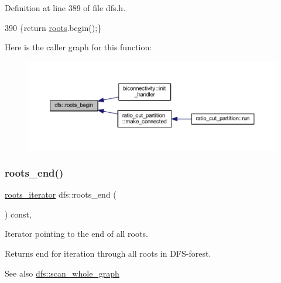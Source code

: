 Definition at line 389 of file dfs.\+h.


\begin{DoxyCode}
390     \{\textcolor{keywordflow}{return} \mbox{\hyperlink{classdfs_a0bbd5cb8df26c891b74dadd84b46a06b}{roots}}.begin();\}
\end{DoxyCode}
Here is the caller graph for this function\+:
\nopagebreak
\begin{figure}[H]
\begin{center}
\leavevmode
\includegraphics[width=350pt]{classdfs_af56fa2b736f0b924dba1257e18ba4b61_icgraph}
\end{center}
\end{figure}
\mbox{\label{classdfs_ae1a61d8c2d8d99059cab410f766ec73f}} 
\subsubsection{\texorpdfstring{roots\+\_\+end()}{roots\_end()}}
{\footnotesize\ttfamily \mbox{\hyperlink{classdfs_a1ea6e8eb2766ac95ac48a8523359065a}{roots\+\_\+iterator}} dfs\+::roots\+\_\+end (\begin{DoxyParamCaption}{ }\end{DoxyParamCaption}) const\hspace{0.3cm}{\ttfamily [inline]}, {\ttfamily [inherited]}}



Iterator pointing to the end of all roots. 

\begin{DoxyReturn}{Returns}
end for iteration through all roots in D\+F\+S-\/forest. 
\end{DoxyReturn}
\begin{DoxySeeAlso}{See also}
\mbox{\hyperlink{classdfs_aa7c864a6f3a120720138b187b3ed95b5}{dfs\+::scan\+\_\+whole\+\_\+graph}} 
\end{DoxySeeAlso}


